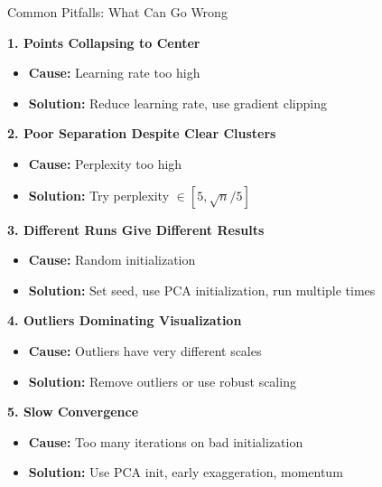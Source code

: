 \documentclass[10pt]{beamer}
\begin{document}
\begin{frame}{Common Pitfalls: What Can Go Wrong}

\textbf{1. Points Collapsing to Center}
\begin{itemize}
    \setlength\itemsep{0em}
    \item \textbf{Cause:} Learning rate too high
    \item \textbf{Solution:} Reduce learning rate, use gradient clipping
\end{itemize}

\vspace{0.15cm}
\textbf{2. Poor Separation Despite Clear Clusters}
\begin{itemize}
    \setlength\itemsep{0em}
    \item \textbf{Cause:} Perplexity too high
    \item \textbf{Solution:} Try perplexity $\in [5, \sqrt{n}/5]$
\end{itemize}

\vspace{0.15cm}
\textbf{3. Different Runs Give Different Results}
\begin{itemize}
    \setlength\itemsep{0em}
    \item \textbf{Cause:} Random initialization
    \item \textbf{Solution:} Set seed, use PCA initialization, run multiple times
\end{itemize}

\vspace{0.15cm}
\textbf{4. Outliers Dominating Visualization}
\begin{itemize}
    \setlength\itemsep{0em}
    \item \textbf{Cause:} Outliers have very different scales
    \item \textbf{Solution:} Remove outliers or use robust scaling
\end{itemize}

\vspace{0.15cm}
\textbf{5. Slow Convergence}
\begin{itemize}
    \setlength\itemsep{0em}
    \item \textbf{Cause:} Too many iterations on bad initialization
    \item \textbf{Solution:} Use PCA init, early exaggeration, momentum
\end{itemize}

\end{frame}
\end{document}
